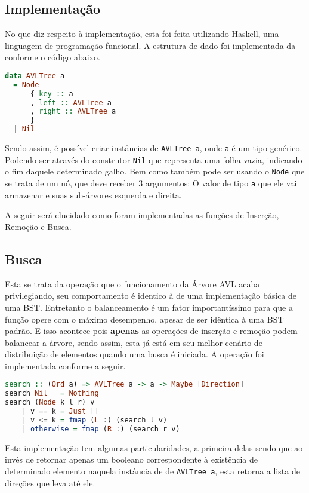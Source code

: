 \subsection{Implementação}

No que diz respeito à implementação, esta foi feita utilizando Haskell, uma linguagem de programação funcional. A estrutura de dado foi implementada da conforme o código abaixo.

\begin{lstlisting}[language=haskell]
data AVLTree a
  = Node
      { key :: a
      , left :: AVLTree a
      , right :: AVLTree a
      }
  | Nil
\end{lstlisting}

Sendo assim, é possível criar instâncias de \texttt{AVLTree a}, onde \texttt{a} é um tipo genérico. Podendo ser através do construtor \texttt{Nil} que representa uma folha vazia, indicando o fim daquele determinado galho. Bem como também pode ser usando o \texttt{Node} que se trata de um nó, que deve receber 3 argumentos: O valor de tipo \texttt{a} que ele vai armazenar e suas sub-árvores esquerda e direita.

A seguir será elucidado como foram implementadas as funções de Inserção, Remoção e Busca.

\subsection{Busca}
Esta se trata da operação que o funcionamento da Árvore AVL acaba privilegiando, seu comportamento é identico à de uma implementação básica de uma BST. Entretanto o balanceamento é um fator importantíssimo para que a função opere com o máximo desempenho, apesar de ser idêntica à uma BST padrão. E isso acontece pois \textbf{apenas} as operações de inserção e remoção podem balancear a árvore, sendo assim, esta já está em seu melhor cenário de distribuição de elementos quando uma busca é iniciada.
A operação foi implementada conforme a seguir.

\begin{lstlisting}[language=haskell]
search :: (Ord a) => AVLTree a -> a -> Maybe [Direction]
search Nil _ = Nothing
search (Node k l r) v
    | v == k = Just []
    | v <= k = fmap (L :) (search l v)
    | otherwise = fmap (R :) (search r v)
\end{lstlisting}

Esta implementação tem algumas particularidades, a primeira delas sendo que ao invés de retornar apenas um booleano correspondente à existência de determinado elemento naquela instância de de \texttt{AVLTree a}, esta retorna a lista de direções que leva até ele.

